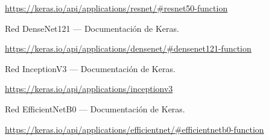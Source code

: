 \documentclass[12pt, spanish]{article}
\begin{document}
\begin{thebibliography}{9}
\url{https://keras.io/api/applications/resnet/#resnet50-function}


Red DenseNet121 --- Documentación de Keras.

\url{https://keras.io/api/applications/densenet/#densenet121-function}


Red InceptionV3 --- Documentación de Keras.

\url{https://keras.io/api/applications/inceptionv3}



Red EfficientNetB0 --- Documentación de Keras.

\url{https://keras.io/api/applications/efficientnet/#efficientnetb0-function}




\end{thebibliography}
\end{document}
